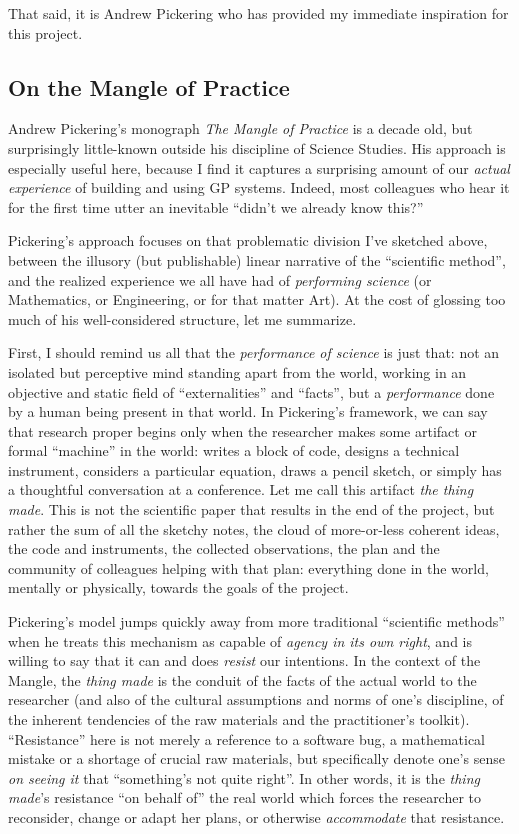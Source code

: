 That said, it is Andrew Pickering who has provided my immediate inspiration for this project.

\subsection{On the Mangle of Practice}\hypertarget{on-the-mangle-of-practice}{}\label{on-the-mangle-of-practice}

Andrew Pickering's monograph \emph{The Mangle of Practice} \citep{Pickering1995} is a decade old, but surprisingly little-known outside his discipline of Science Studies. His approach is especially useful here, because I find it captures a surprising amount of our \emph{actual experience} of building and using GP systems. Indeed, most colleagues who hear it for the first time utter an inevitable ``didn't we already know this?''

Pickering's approach focuses on that problematic division I've sketched above, between the illusory (but publishable) linear narrative of the ``scientific method'', and the realized experience we all have had of \emph{performing science} (or Mathematics, or Engineering, or for that matter Art). At the cost of glossing too much of his well-considered structure, let me summarize.

First, I should remind us all that the \emph{performance of science} is just that: not an isolated but perceptive mind standing apart from the world, working in an objective and static field of ``externalities'' and ``facts'', but a \emph{performance} done by a human being present in that world. In Pickering's  framework, we can say that research proper begins only when the researcher makes some artifact or formal ``machine'' in the world: writes a block of code, designs a technical instrument, considers a particular equation, draws a pencil sketch, or simply has a thoughtful conversation at a conference. Let me call this artifact \emph{the thing made}. This is not the scientific paper that results in the end of the project, but rather the sum of all the sketchy notes, the cloud of more-or-less coherent ideas, the code and instruments, the collected observations, the plan and the community of colleagues helping with that plan: everything done in the world, mentally or physically, towards the goals of the project.

Pickering's model jumps quickly away from more traditional ``scientific methods'' when he treats this mechanism as capable of \emph{agency in its own right}, and is willing to say that it can and does \emph{resist} our intentions. In the context of the Mangle, the \emph{thing made} is the conduit of the facts of the actual world to the researcher (and also of the cultural assumptions and norms of one's discipline, of the inherent tendencies of the raw materials and the practitioner's toolkit). ``Resistance'' here is not merely a reference to a software bug, a mathematical mistake or a shortage of crucial raw materials, but specifically denote one's sense \emph{on seeing it} that ``something's not quite right''. In other words, it is the \emph{thing made}'s resistance ``on behalf of'' the real world which forces the researcher to reconsider, change or adapt her plans, or otherwise \emph{accommodate} that resistance.

